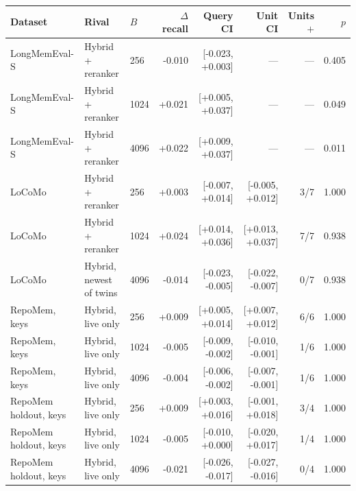 \begin{tabular}{@{}lllrrrrr@{}}\toprule
Dataset & Rival & $B$ & $\Delta$ recall & Query CI & Unit CI & Units $+$ & $p$ \\\midrule
LongMemEval-S & Hybrid + reranker & 256 & -0.010 & [-0.023, +0.003] & --- & --- & 0.405 \\
LongMemEval-S & Hybrid + reranker & 1024 & +0.021 & [+0.005, +0.037] & --- & --- & 0.049 \\
LongMemEval-S & Hybrid + reranker & 4096 & +0.022 & [+0.009, +0.037] & --- & --- & 0.011 \\
\addlinespace
LoCoMo & Hybrid + reranker & 256 & +0.003 & [-0.007, +0.014] & [-0.005, +0.012] & 3/7 & 1.000 \\
LoCoMo & Hybrid + reranker & 1024 & +0.024 & [+0.014, +0.036] & [+0.013, +0.037] & 7/7 & 0.938 \\
LoCoMo & Hybrid, newest of twins & 4096 & -0.014 & [-0.023, -0.005] & [-0.022, -0.007] & 0/7 & 0.938 \\
\addlinespace
RepoMem, keys & Hybrid, live only & 256 & +0.009 & [+0.005, +0.014] & [+0.007, +0.012] & 6/6 & 1.000 \\
RepoMem, keys & Hybrid, live only & 1024 & -0.005 & [-0.009, -0.002] & [-0.010, -0.001] & 1/6 & 1.000 \\
RepoMem, keys & Hybrid, live only & 4096 & -0.004 & [-0.006, -0.002] & [-0.007, -0.001] & 1/6 & 1.000 \\
\addlinespace
RepoMem holdout, keys & Hybrid, live only & 256 & +0.009 & [+0.003, +0.016] & [-0.001, +0.018] & 3/4 & 1.000 \\
RepoMem holdout, keys & Hybrid, live only & 1024 & -0.005 & [-0.010, +0.000] & [-0.020, +0.017] & 1/4 & 1.000 \\
RepoMem holdout, keys & Hybrid, live only & 4096 & -0.021 & [-0.026, -0.017] & [-0.027, -0.016] & 0/4 & 1.000 \\
\bottomrule\end{tabular}
